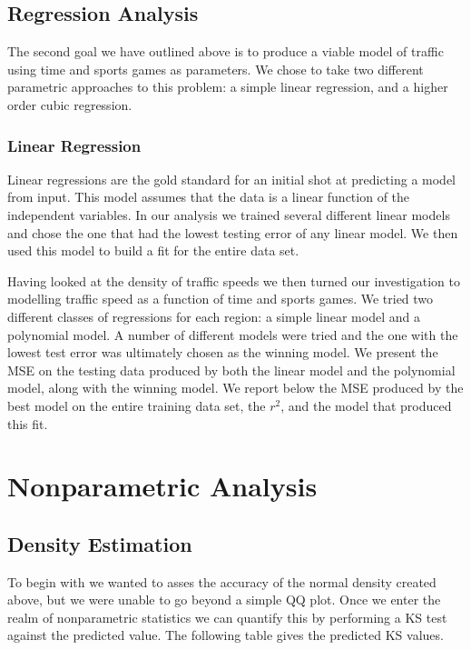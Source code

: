 \documentclass[12pt]{article}
\begin{document}
\begin{multicols*}{2}
\subsection{Regression Analysis}
The second goal we have outlined above is to produce a viable model of traffic using time and sports games as parameters. We chose to take two different parametric approaches to this problem: a simple linear regression, and a higher order cubic regression.
\subsubsection{Linear Regression}
Linear regressions are the gold standard for an initial shot at predicting a model from input. This model assumes that the data is a linear function of the independent variables.  In our analysis we trained several different linear models and chose the one that had the lowest testing error of any linear model. We then used this model to build a fit for the entire data set.


Having looked at the density of traffic speeds we then turned our investigation to modelling traffic speed as a function of time and sports games. We tried two different classes of regressions for each region: a simple linear model and a polynomial model. A number of different models were tried and the one with the lowest test error was ultimately chosen as the winning model. We present the MSE on the testing data produced by both the linear model and the polynomial model, along with the winning model. We report below the MSE produced by the best model on the entire training data set, the $r^2$, and the model that produced this fit.
\section{Nonparametric Analysis}
\subsection{Density Estimation}
To begin with we wanted to asses the accuracy of the normal density created above, but we were unable to go beyond a simple QQ plot. Once we enter the realm of nonparametric statistics we can quantify this by performing a KS test against the predicted value. The following table gives the predicted KS values.


\end{multicols*}
\end{document}
